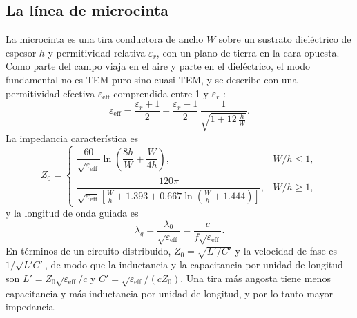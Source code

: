 \documentclass[11pt,letterpaper]{article}
\begin{document}
\subsection{La línea de microcinta}
La microcinta es una tira conductora de ancho $W$ sobre un sustrato dieléctrico de espesor $h$ y permitividad relativa $\varepsilon_r$, con un plano de tierra en la cara opuesta. Como parte del campo viaja en el aire y parte en el dieléctrico, el modo fundamental no es TEM puro sino cuasi-TEM, y se describe con una permitividad efectiva $\varepsilon_{\mathrm{eff}}$ comprendida entre 1 y $\varepsilon_r$ \cite{pozar}:
\begin{equation}
\varepsilon_{\mathrm{eff}} = \frac{\varepsilon_r+1}{2} + \frac{\varepsilon_r-1}{2}\,\frac{1}{\sqrt{1+12\,\frac{h}{W}}}.
\label{eq:eeff}
\end{equation}
La impedancia característica es
\begin{equation}
Z_0 =
\begin{cases}
\dfrac{60}{\sqrt{\varepsilon_{\mathrm{eff}}}}\ln\!\left(\dfrac{8h}{W}+\dfrac{W}{4h}\right), & W/h\leq 1,\\[12pt]
\dfrac{120\pi}{\sqrt{\varepsilon_{\mathrm{eff}}}\left[\frac{W}{h}+1.393+0.667\ln\!\left(\frac{W}{h}+1.444\right)\right]}, & W/h\geq 1,
\end{cases}
\label{eq:z0}
\end{equation}
y la longitud de onda guiada es
\begin{equation}
\lambda_g = \frac{\lambda_0}{\sqrt{\varepsilon_{\mathrm{eff}}}} = \frac{c}{f\sqrt{\varepsilon_{\mathrm{eff}}}}.
\label{eq:lg}
\end{equation}
En términos de un circuito distribuido, $Z_0=\sqrt{L'/C'}$ y la velocidad de fase es $1/\sqrt{L'C'}$, de modo que la inductancia y la capacitancia por unidad de longitud son $L'=Z_0\sqrt{\varepsilon_{\mathrm{eff}}}/c$ y $C'=\sqrt{\varepsilon_{\mathrm{eff}}}/(cZ_0)$. Una tira más angosta tiene menos capacitancia y más inductancia por unidad de longitud, y por lo tanto mayor impedancia.
\end{document}
